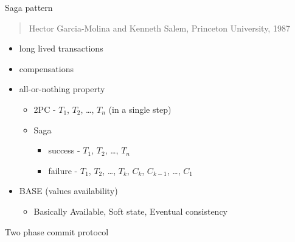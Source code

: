\documentclass{beamer}
\begin{document}
\begin{frame}{Saga pattern}

\begin{quotation}
\begin{center}
    Hector Garcia-Molina and Kenneth Salem, Princeton University, 1987
\end{center}
\end{quotation}

\Large
\begin{itemize}
    \item long lived transactions
    \item compensations
    \begin{itemize}
        
    \end{itemize}
    \item all-or-nothing property
    \begin{itemize}
        \item 2PC - $T_1$, $T_2$, \dots, $T_n$ (in a single step)
        \item Saga
        \begin{itemize}
            \item success - $T_1$, $T_2$, \dots, $T_n$
            \item failure - $T_1$, $T_2$, \dots, $T_k$, $C_k$, $C_{k-1}$, \dots, $C_1$
        \end{itemize}
    \end{itemize}
    \item BASE (values availability)
    \begin{itemize}
        \item Basically Available, Soft state, Eventual consistency
    \end{itemize}
\end{itemize}

\end{frame}

\begin{frame}{Two phase commit protocol}

%

\end{frame}
\end{document}
